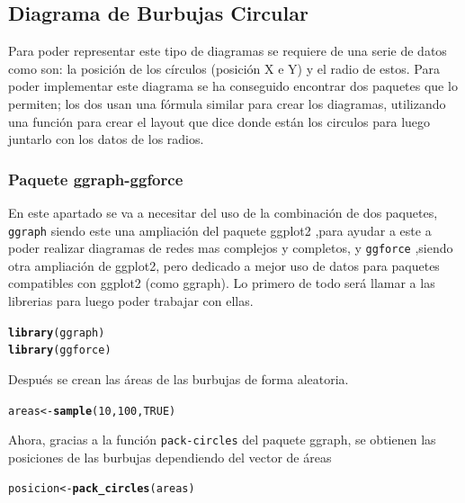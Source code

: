 \documentclass{article}\usepackage[]{graphicx}\usepackage[]{color}
\makeatletter
\newcommand{\hlnum}[1]{\textcolor[rgb]{0.686,0.059,0.569}{#1}}%
\newcommand{\hlstd}[1]{\textcolor[rgb]{0.345,0.345,0.345}{#1}}%
\newcommand{\hlkwb}[1]{\textcolor[rgb]{0.69,0.353,0.396}{#1}}%
\newcommand{\hlkwd}[1]{\textcolor[rgb]{0.737,0.353,0.396}{\textbf{#1}}}%
\newenvironment{kframe}{%
 \def\at@end@of@kframe{}%
 \ifinner\ifhmode%
  \def\at@end@of@kframe{\end{minipage}}%
  \begin{minipage}{\columnwidth}%
 \fi\fi%
 \def\FrameCommand##1{\hskip\@totalleftmargin \hskip-\fboxsep
 \colorbox{shadecolor}{##1}\hskip-\fboxsep
     \hskip-\linewidth \hskip-\@totalleftmargin \hskip\columnwidth}%
 \MakeFramed {\advance\hsize-\width
   \@totalleftmargin\z@ \linewidth\hsize
   \@setminipage}}%
 {\par\unskip\endMakeFramed%
 \at@end@of@kframe}
\newenvironment{knitrout}{}{} %
\makeatother
\begin{document}
\subsection{Diagrama de Burbujas Circular}\label{ssec:burbujas}
Para poder representar este tipo de diagramas se requiere de una serie de datos como son: la posici\'on de los c\'irculos (posici\'on X e Y) y el radio de estos. Para poder implementar este diagrama se ha conseguido encontrar dos paquetes que lo permiten; los dos usan una f\'ormula similar para crear los diagramas, utilizando una funci\'on para crear el layout que dice donde est\'an los circulos para luego juntarlo con los datos de los radios.
\subsubsection{Paquete ggraph-ggforce}
En este apartado se va a necesitar del uso de la combinaci\'on de dos paquetes, \texttt{ggraph} \cite{docu_ggraph}
siendo este una ampliaci\'on del paquete ggplot2 \cite{docu_ggplot2}
,para ayudar a este a poder realizar diagramas de redes mas complejos y completos, y \texttt{ggforce} \cite{docu_ggforce} 
,siendo otra ampliaci\'on de ggplot2, pero dedicado a mejor uso de datos para paquetes compatibles con ggplot2 (como ggraph).
Lo primero de todo ser\'a llamar a las librerias para luego poder trabajar con ellas.
\begin{knitrout}
\color{fgcolor}\begin{kframe}
\begin{alltt}
\hlkwd{library}\hlstd{(ggraph)}
\hlkwd{library}\hlstd{(ggforce)}
\end{alltt}
\end{kframe}
\end{knitrout}
Despu\'es se crean las \'areas de las burbujas de forma aleatoria.
\begin{knitrout}
\color{fgcolor}\begin{kframe}
\begin{alltt}
\hlstd{areas} \hlkwb{<-} \hlkwd{sample}\hlstd{(}\hlnum{10}\hlstd{,} \hlnum{100}\hlstd{,} \hlnum{TRUE}\hlstd{)}
\end{alltt}
\end{kframe}
\end{knitrout}
Ahora, gracias a la funci\'on \texttt{pack-circles} del paquete ggraph, se obtienen las posiciones de las burbujas dependiendo del vector de \'areas
\begin{knitrout}
\color{fgcolor}\begin{kframe}
\begin{alltt}
\hlstd{posicion} \hlkwb{<-} \hlkwd{pack_circles}\hlstd{(areas)}
\end{alltt}
\end{kframe}
\end{knitrout}
\end{document}

